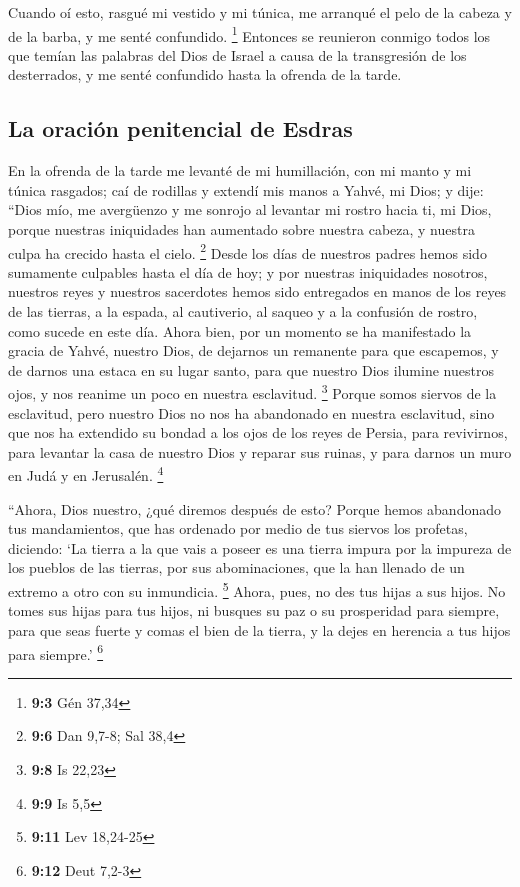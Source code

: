 \begin{paracol}{2}
 Cuando oí esto, rasgué mi vestido y mi túnica, me
arranqué el pelo de la cabeza y de la barba, y me senté confundido.
\footnote{\textbf{9:3} Gén 37,34}  Entonces se reunieron
conmigo todos los que temían las palabras del Dios de Israel a causa de
la transgresión de los desterrados, y me senté confundido hasta la
ofrenda de la tarde.

\hypertarget{la-oraciuxf3n-penitencial-de-esdras}{%
\subsection{La oración penitencial de
Esdras}\label{la-oraciuxf3n-penitencial-de-esdras}}

 En la ofrenda de la tarde me levanté de mi humillación,
con mi manto y mi túnica rasgados; caí de rodillas y extendí mis manos a
Yahvé, mi Dios;  y dije: ``Dios mío, me avergüenzo y me
sonrojo al levantar mi rostro hacia ti, mi Dios, porque nuestras
iniquidades han aumentado sobre nuestra cabeza, y nuestra culpa ha
crecido hasta el cielo. \footnote{\textbf{9:6} Dan 9,7-8; Sal 38,4}
 Desde los días de nuestros padres hemos sido sumamente
culpables hasta el día de hoy; y por nuestras iniquidades nosotros,
nuestros reyes y nuestros sacerdotes hemos sido entregados en manos de
los reyes de las tierras, a la espada, al cautiverio, al saqueo y a la
confusión de rostro, como sucede en este día.  Ahora bien,
por un momento se ha manifestado la gracia de Yahvé, nuestro Dios, de
dejarnos un remanente para que escapemos, y de darnos una estaca en su
lugar santo, para que nuestro Dios ilumine nuestros ojos, y nos reanime
un poco en nuestra esclavitud. \footnote{\textbf{9:8} Is 22,23}
 Porque somos siervos de la esclavitud, pero nuestro Dios
no nos ha abandonado en nuestra esclavitud, sino que nos ha extendido su
bondad a los ojos de los reyes de Persia, para revivirnos, para levantar
la casa de nuestro Dios y reparar sus ruinas, y para darnos un muro en
Judá y en Jerusalén. \footnote{\textbf{9:9} Is 5,5}

 ``Ahora, Dios nuestro, ¿qué diremos después de esto?
Porque hemos abandonado tus mandamientos,  que has
ordenado por medio de tus siervos los profetas, diciendo: `La tierra a
la que vais a poseer es una tierra impura por la impureza de los pueblos
de las tierras, por sus abominaciones, que la han llenado de un extremo
a otro con su inmundicia. \footnote{\textbf{9:11} Lev 18,24-25}
 Ahora, pues, no des tus hijas a sus hijos. No tomes sus
hijas para tus hijos, ni busques su paz o su prosperidad para siempre,
para que seas fuerte y comas el bien de la tierra, y la dejes en
herencia a tus hijos para siempre.' \footnote{\textbf{9:12} Deut 7,2-3}


\end{paracol}
